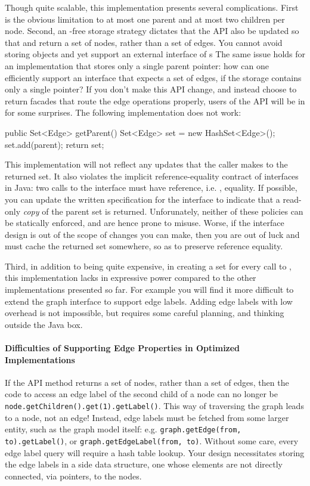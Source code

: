 Though quite scalable, this implementation presents several complications. First
is the obvious limitation to at most one parent and at most two children per
node. Second, an -free storage strategy dictates that the
 API also be updated so that  and
 return a set of nodes, rather than a set of edges. You
cannot avoid storing  objects and yet support an external interface
of s The same issue holds for an implementation that stores only a
single parent pointer: how can one efficiently support an interface that expects
a set of edges, if the storage contains only a single pointer? If you don't make
this API change, and instead choose to return facades that route the edge
operations properly, users of the API will be in for some surprises. The
following implementation does not work:
\begin{shortlisting}
public Set<Edge> getParent() {
   Set<Edge> set = new HashSet<Edge>();
   set.add(parent);
   return set;
}
\end{shortlisting}
This implementation will not reflect any updates that the caller makes to the
returned set. It also violates the implicit reference-equality contract of
interfaces in Java: two calls to the  interface must have
reference, i.e. \code{==}, equality. If possible, you can update
the written specification for the interface to indicate that a read-only
\emph{copy} of the parent set is returned. Unforunately, neither of these
policies can be statically enforced, and are hence prone to misuse.
Worse, if the interface design is out of the
scope of changes you can make, then you are out of luck and must cache the
returned set somewhere, so as to preserve reference equality.

Third, in addition to being quite expensive, in creating a set for every call to
, this implementation lacks in expressive power compared to the
other implementations presented so far. For example you will find it more
difficult to extend the graph interface to support edge labels. Adding edge
labels with low overhead is not impossible, but requires some careful planning,
and thinking outside the Java box.

\paragraph{Difficulties of Supporting Edge Properties in Optimized
Implementations} If the API method  returns a set of
nodes, rather than a set of edges, then the code to access an edge label of the
second child of a node can no longer be
\texttt{node.getChildren().\-get(1).getLabel()}. This way of traversing the graph
leads to a node, not an edge! Instead, edge labels must be fetched from some
larger entity, such as the graph model itself: e.g. \texttt{graph.getEdge(from,
to).getLabel()}, or \texttt{graph.getEdgeLabel(from, to)}. Without some care,
every edge label query will require a hash table lookup. Your design necessitates
storing the edge labels in a side data structure, one whose elements are not
directly connected, via pointers, to the nodes.

